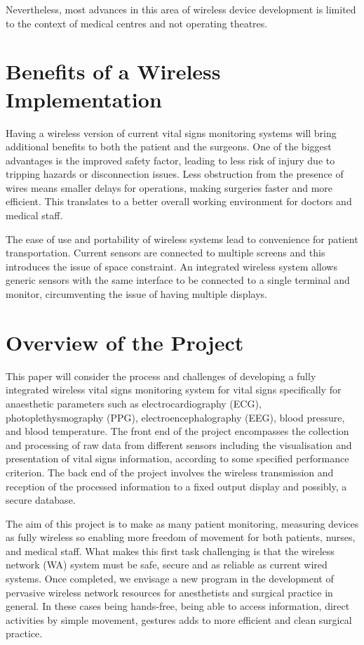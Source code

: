 Nevertheless, most advances in this area of wireless device development is limited to the context of medical centres and not operating theatres.  

\section{Benefits of a Wireless Implementation}

Having a wireless version of current vital signs monitoring systems will bring additional benefits to both the patient and the surgeons. One of the biggest advantages is the improved safety factor, leading to less risk of injury due to tripping hazards or disconnection issues. Less obstruction from the presence of wires means smaller delays for operations, making surgeries faster and more efficient. This translates to a better overall working environment for doctors and medical staff. 

The ease of use and portability of wireless systems lead to convenience for patient transportation. Current sensors are connected to multiple screens and this introduces the issue of space constraint. An integrated wireless system allows generic sensors with the same interface to be connected to a single terminal and monitor, circumventing the issue of having multiple displays. 

\section{Overview of the Project}

This  paper will  consider the  process and challenges of  developing a fully integrated wireless vital signs monitoring system for vital signs specifically for anaesthetic parameters such as electrocardiography (ECG), photoplethysmography (PPG), electroencephalography (EEG), blood pressure, and blood temperature. The  front end of the project encompasses the collection and processing of raw data from different sensors including the visualisation and presentation of vital signs information,  according  to some specified performance criterion. The back end of the project involves the wireless transmission and reception of the processed information to a fixed output display and possibly, a secure database. 

The aim of this project is to make as many patient monitoring, measuring devices as fully wireless so enabling more freedom of movement for both patients, nurses, and medical staff. What makes this first task challenging is that the wireless network (WA) system must be safe, secure and as reliable as current wired systems. Once completed, we envisage a new program in the development of pervasive wireless network resources for anesthetists and surgical practice in general. In these cases being hands-free, being able to access information, direct activities by simple movement, gestures adds to more efficient and clean surgical practice. \\

